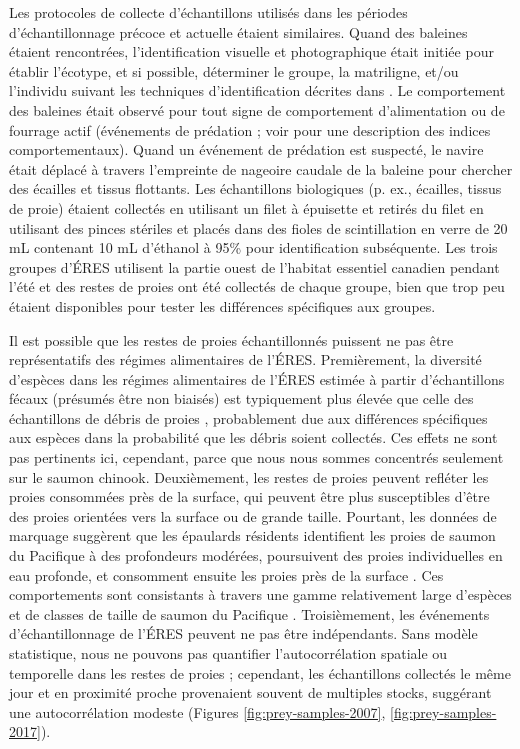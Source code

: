 Les protocoles de collecte d'échantillons utilisés dans les périodes d'échantillonnage précoce et actuelle étaient similaires. Quand des baleines étaient rencontrées, l'identification visuelle et photographique était initiée pour établir l'écotype, et si possible, déterminer le groupe, la matriligne, et/ou l'individu suivant les techniques d'identification décrites dans \cite{biggKillerWhalesStudy1987}. Le comportement des baleines était observé pour tout signe de comportement d'alimentation ou de fourrage actif (événements de prédation ; voir \citet{stredulinskyDelineatingImportantKiller2023} pour une description des indices comportementaux). Quand un événement de prédation est suspecté, le navire était déplacé à travers l'empreinte de nageoire caudale de la baleine pour chercher des écailles et tissus flottants. Les échantillons biologiques (p. ex., écailles, tissus de proie) étaient collectés en utilisant un filet à épuisette et retirés du filet en utilisant des pinces stériles et placés dans des fioles de scintillation en verre de 20 mL contenant 10 mL d'éthanol à 95\% pour identification subséquente. Les trois groupes d'ÉRES utilisent la partie ouest de l'habitat essentiel canadien pendant l'été et des restes de proies ont été collectés de chaque groupe, bien que trop peu étaient disponibles pour tester les différences spécifiques aux groupes.

Il est possible que les restes de proies échantillonnés puissent ne pas être représentatifs des régimes alimentaires de l'ÉRES. Premièrement, la diversité d'espèces dans les régimes alimentaires de l'ÉRES estimée à partir d'échantillons fécaux (présumés être non biaisés) est typiquement plus élevée que celle des échantillons de débris de proies \citep{hansonEndangeredPredatorsEndangered2021}, probablement due aux différences spécifiques aux espèces dans la probabilité que les débris soient collectés. Ces effets ne sont pas pertinents ici, cependant, parce que nous nous sommes concentrés seulement sur le saumon chinook. Deuxièmement, les restes de proies peuvent refléter les proies consommées près de la surface, qui peuvent être plus susceptibles d'être des proies orientées vers la surface ou de grande taille. Pourtant, les données de marquage suggèrent que les épaulards résidents identifient les proies de saumon du Pacifique à des profondeurs modérées, poursuivent des proies individuelles en eau profonde, et consomment ensuite les proies près de la surface \citep{wrightBehavioralContextEcholocation2021}. Ces comportements sont consistants à travers une gamme relativement large d'espèces et de classes de taille de saumon du Pacifique \citep{wrightBehavioralContextEcholocation2021}. Troisièmement, les événements d'échantillonnage de l'ÉRES peuvent ne pas être indépendants. Sans modèle statistique, nous ne pouvons pas quantifier l'autocorrélation spatiale ou temporelle dans les restes de proies ; cependant, les échantillons collectés le même jour et en proximité proche provenaient souvent de multiples stocks, suggérant une autocorrélation modeste (Figures \ref{fig:prey-samples-2007}, \ref{fig:prey-samples-2017}).

